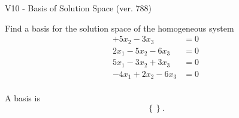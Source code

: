 \begin{exercise}
  \begin{exerciseTitle}V10 - Basis of Solution Space (ver. 788)\end{exerciseTitle}
  \begin{exerciseStatement}
    Find a basis for the solution space of the homogeneous system 
\begin{align*}
 + 5 x_ 2 -3 x_ 3 &= 0  \\ 
  2 x_ 1 -5 x_ 2 -6 x_ 3 &= 0  \\ 
  5 x_ 1 -3 x_ 2 + 3 x_ 3 &= 0  \\ 
  -4 x_ 1 + 2 x_ 2 -6 x_ 3 &= 0  \\ 
 \end{align*}


 
  \end{exerciseStatement}

  \begin{exerciseAnswer}
   A basis is   
\[\left\{\right\}.\]

  


  \end{exerciseAnswer}
\end{exercise}